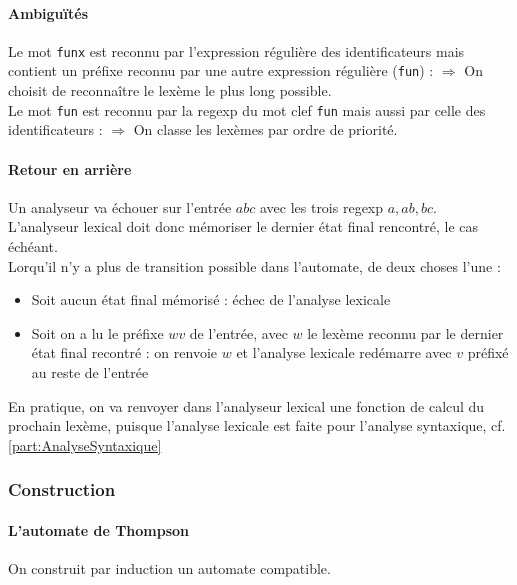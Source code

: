 \documentclass{cours}
\begin{document}
\paragraph*{Ambiguïtés}
Le mot \texttt{funx} est reconnu par l'expression régulière des identificateurs mais contient un préfixe reconnu par une autre expression régulière (\texttt{fun}) : $\Rightarrow$ On choisit de reconnaître le lexème le plus long possible.\\
Le mot \texttt{fun} est reconnu par la regexp du mot clef \texttt{fun} mais aussi par celle des identificateurs : $\Rightarrow$ On classe les lexèmes par ordre de priorité.

\paragraph*{Retour en arrière}
Un analyseur va échouer sur l'entrée $abc$ avec les trois regexp $a, ab, bc$.
L'analyseur lexical doit donc mémoriser le dernier état final rencontré, le cas échéant.\\

Lorqu'il n'y a plus de transition possible dans l'automate, de deux choses l'une :
\begin{itemize}
    \item Soit aucun état final mémorisé : échec de l'analyse lexicale
    \item Soit on a lu le préfixe $wv$ de l'entrée, avec $w$ le lexème reconnu par le dernier état final recontré : on renvoie $w$ et l'analyse lexicale redémarre avec $v$ préfixé au reste de l'entrée
\end{itemize}
En pratique, on va renvoyer dans l'analyseur lexical une fonction de calcul du prochain lexème, puisque l'analyse lexicale est faite pour l'analyse syntaxique, cf. \ref{part:AnalyseSyntaxique}

\subsubsection{Construction}
\paragraph*{L'automate de Thompson}
On construit par induction un automate compatible. 
\end{document}

